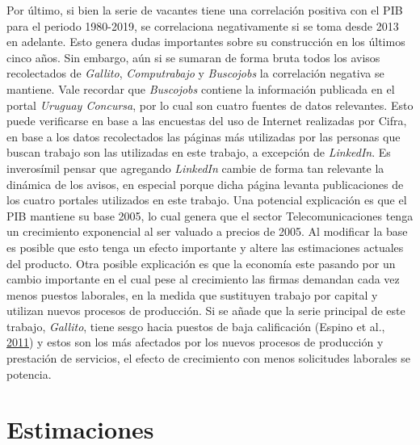 \documentclass[12pt,oneside]{reedthesis}
\begin{document}
Por último, si bien la serie de vacantes tiene una correlación positiva con el PIB para el periodo 1980-2019, se correlaciona negativamente si se toma desde 2013 en adelante. Esto genera dudas importantes sobre su construcción en los últimos cinco años. Sin embargo, aún si se sumaran de forma bruta todos los avisos recolectados de \emph{Gallito}, \emph{Computrabajo} y \emph{Buscojobs} la correlación negativa se mantiene. Vale recordar que \emph{Buscojobs} contiene la información publicada en el portal \emph{Uruguay Concursa}, por lo cual son cuatro fuentes de datos relevantes. Esto puede verificarse en base a las encuestas del uso de Internet realizadas por Cifra, en base a los datos recolectados las páginas más utilizadas por las personas que buscan trabajo son las utilizadas en este trabajo, a excepción de \emph{LinkedIn}. Es inverosímil pensar que agregando \emph{LinkedIn} cambie de forma tan relevante la dinámica de los avisos, en especial porque dicha página levanta publicaciones de los cuatro portales utilizados en este trabajo. Una potencial explicación es que el PIB mantiene su base 2005, lo cual genera que el sector Telecomunicaciones tenga un crecimiento exponencial al ser valuado a precios de 2005. Al modificar la base es posible que esto tenga un efecto importante y altere las estimaciones actuales del producto. Otra posible explicación es que la economía este pasando por un cambio importante en el cual pese al crecimiento las firmas demandan cada vez menos puestos laborales, en la medida que sustituyen trabajo por capital y utilizan nuevos procesos de producción. Si se añade que la serie principal de este trabajo, \emph{Gallito}, tiene sesgo hacia puestos de baja calificación (Espino et al., \protect\hyperlink{ref-Alma2011}{2011}) y estos son los más afectados por los nuevos procesos de producción y prestación de servicios, el efecto de crecimiento con menos solicitudes laborales se potencia.

\hypertarget{estimaciones}{%
\section{Estimaciones}\label{estimaciones}}
\end{document}

